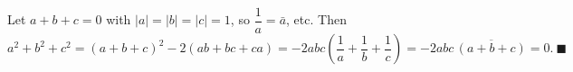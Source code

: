 Let $a+b+c=0$ with $|a|=|b|=|c|=1$, so $\dfrac1a=\bar a$, etc. Then
\[a^2+b^2+c^2=(a+b+c)^2-2(ab+bc+ca)=-2abc\left(\dfrac1a+\dfrac1b+\dfrac1c\right)=-2abc\,\overline{(a+b+c)}=0.\ \blacksquare\]
